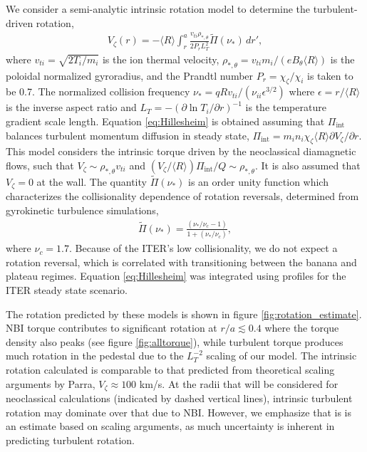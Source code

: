 \documentclass[aip, pop, preprint]{revtex4-1}
\numberwithin{figure}{section}
\numberwithin{equation}{section}
\begin{document}
We consider a semi-analytic intrinsic rotation model to determine the turbulent-driven rotation,\cite{Hillesheim2015}
\begin{gather}
V_{\zeta}(r) = - \langle R \rangle \int_{r}^a \frac{v_{ti} \rho_{*,\theta}} {2 P_r L_T^2} \widetilde{\Pi} (\nu_*) \, d r',
\label{eq:Hillesheim}
\end{gather} 
where $v_{ti} = \sqrt{2T_i/m_i}$ is the ion thermal velocity, $\rho_{*,\theta} = v_{ti} m_i/(e B_{\theta} \langle R \rangle) $ is the poloidal normalized gyroradius, and the Prandtl number $P_r = \chi_{\zeta}/\chi_i$ is taken to be 0.7. The normalized collision frequency $\nu_* = q R v_{ti}/(\nu_{ii} \epsilon^{3/2})$ where $\epsilon = r/\langle R \rangle$ is the inverse aspect ratio and $L_T = - \left( \partial \ln T_i/ \partial r \right)^{-1}$ is the temperature gradient scale length. Equation \ref{eq:Hillesheim} is obtained assuming that $\Pi_{\text{int}}$ balances turbulent momentum diffusion in steady state, $\Pi_{\text{int}} = m_i n_i \chi_{\zeta} \langle R \rangle \partial V_{\zeta}/\partial r$. This model considers the intrinsic torque driven by the neoclassical diamagnetic flows, such that $V_{\zeta} \sim \rho_{*,\theta} v_{ti}$ and $(V_{\zeta}/\langle R \rangle) \Pi_{\text{int}}/Q \sim \rho_{*, \theta}$. It is also assumed that $V_{\zeta} = 0$ at the wall. %
The quantity $\widetilde{\Pi} (\nu_*)$ is an order unity function which characterizes the collisionality dependence of rotation reversals, determined from gyrokinetic turbulence simulations,\cite{Barnes2013}
\begin{gather}
\widetilde{\Pi} (\nu_*) = \frac{(\nu_*/\nu_c -1)}{1 + (\nu_*/\nu_c)},
\end{gather}
where $\nu_c = 1.7$. Because of the ITER's low collisionality, we do not expect a rotation reversal, which is correlated with transitioning between the banana and plateau regimes. Equation \ref{eq:Hillesheim} was integrated using profiles for the ITER steady state scenario. 

The rotation predicted by these models is shown in figure \ref{fig:rotation_estimate}. NBI torque contributes to significant rotation at $r/a \lesssim 0.4$ where the torque density also peaks (see figure \ref{fig:alltorque}), while turbulent torque produces much rotation in the pedestal due to the $L_T^{-2}$ scaling of our model.  The intrinsic rotation calculated is comparable to that predicted from theoretical scaling arguments by Parra,\cite{Parra2012} $V_{\zeta} \approx 100$ km/s. At the radii that will be considered for neoclassical calculations (indicated by dashed vertical lines), intrinsic turbulent rotation may dominate over that due to NBI. However, we emphasize that is is an estimate based on scaling arguments, as much uncertainty is inherent in predicting turbulent rotation. 
\end{document}
